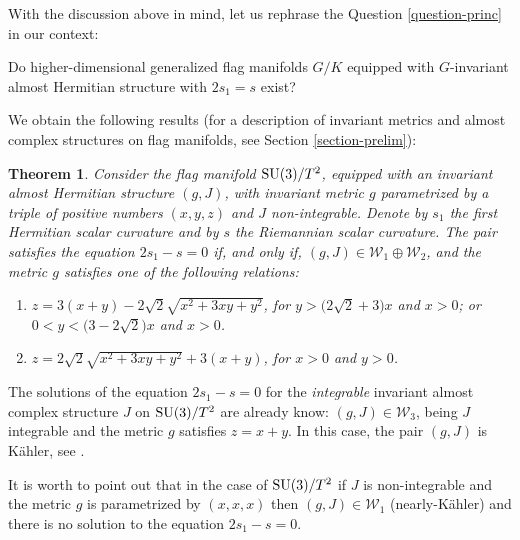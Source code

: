 \documentclass[10pt,a4paper]{amsart}
\numberwithin{equation}{section}
\newtheorem{Theorem}{Theorem}[section]
\begin{document}
With the discussion above in mind, let us rephrase the Question \ref{question-princ} in our context:
\begin{Question} %
Do higher-dimensional generalized flag manifolds $G/K$ equipped with $G$-inva\-ri\-ant almost Hermitian structure with $2s_{1}=s$ exist?
\end{Question}

We obtain the following results (for a description of invariant metrics and almost complex structures on flag manifolds, see Section \ref{section-prelim}):

\begin{Theorem}
Consider the flag manifold ${\rm SU}(3)/T^2$, equipped with an invariant almost Hermitian structure $(g,J)$, with invariant metric $g$ parametrized by a triple of positive numbers $(x,y,z)$ and $J$ non-integrable. Denote by $s_1$ the first Hermitian scalar curvature and by $s$ the Riemannian scalar curvature. The pair satisfies the equation $2s_1-s=0$ if, and only if,
$(g,J) \in\mathcal{W}_{1}\oplus \mathcal{W}_{2}$, and the metric $g$ satisfies one of the following relations:
	\begin{enumerate}\itemsep=0pt
	\item[$1.$] $z=3 (x+y)-2 \sqrt{2} \sqrt{x^2+3 x y+y^2}$, for $y> \big(2\sqrt{2}+3\big)x $ and $x>0$; or
$0<y< \big(3 -2 \sqrt{2}\big)x$ and $x>0$.

	\item[$2.$] $z=2 \sqrt{2} \sqrt{x^2+3 x y+y^2}+3 (x+y)$, for $x>0$ and $y>0$.
	\end{enumerate}
\end{Theorem}

\begin{Remark}
The solutions of the equation $2s_1-s=0$ for the {\em integrable} invariant almost complex structure $J$ on ${\rm SU}(3)/T^2$ are already know: $(g,J)\in\mathcal{W}_{3}$, being $J$ integrable and the metric $g$ satisfies $z=x+y$. In this case, the pair $(g,J)$ is K\"ahler, see \cite{fu2018twistor}.
\end{Remark}
\begin{Remark}
It is worth to point out that in the case of ${\rm SU}(3)/T^2$ if $J$ is non-integrable and the metric $g$ is parametrized by $(x,x,x)$ then $(g,J)\in \mathcal{W}_1$ (nearly-K\"ahler) and there is no solution to the equation $2s_1-s=0$.
\end{Remark}
\end{document}
